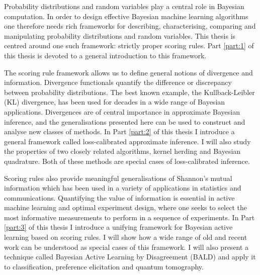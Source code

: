 \begin{abstracts}        %

Probability distributions and random variables play a central role in Bayesian computation. In order to design effective Bayesian machine learning algorithms one therefore needs rich frameworks for describing, characterising, comparing and manipulating probability distributions and random variables. 
\cbstart
This thesis is centred around one such framework: strictly proper scoring rules. Part \ref{part:1} of this thesis is devoted to a general introduction to this framework.
\cbend

The scoring rule framework allows us to define general notions of divergence and information. Divergence functionals quantify the difference or discrepancy between probability distributions. The best known example, the Kullback-Leibler (KL) divergence, has been used for decades in a wide range of Bayesian applications. Divergences are of central importance in approximate Bayesian inference, and the generalisations presented here can be used to construct and analyse new classes of methods. In Part \ref{part:2} of this thesis I introduce a general framework called loss-calibrated approximate inference. I will also study the properties of two closely related algorithms, kernel herding and Bayesian quadrature. Both of these methods are special cases of loss-calibrated inference.

Scoring rules also provide meaningful generalisations of Shannon's mutual information which has been used in a variety of applications in statistics and communications. Quantifying the value of information is essential in active machine learning and optimal experiment design, where one seeks to select the most informative measurements to perform in a sequence of experiments. In Part \ref{part:3} of this thesis I introduce a unifying framework for Bayesian active learning based on scoring rules. I will show how a wide range of old and recent work can be understood as special cases of this framework. I will also present a technique called Bayesian Active Learning by Disagreement (BALD) and apply it to classification, preference elicitation and quantum tomography.

\end{abstracts}